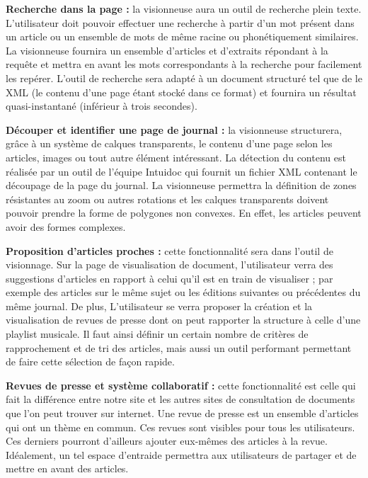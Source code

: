     \textbf{Recherche dans la page :} la visionneuse aura un outil de recherche plein texte. L'utilisateur doit pouvoir effectuer une recherche à partir d’un mot présent dans un article ou un ensemble de mots de même racine ou phonétiquement similaires.
    La visionneuse fournira un ensemble d’articles et d'extraits répondant à la requête et mettra en avant les mots correspondants à la recherche pour facilement les repérer.
    L’outil de recherche sera adapté à un document structuré tel que de le XML (le contenu d’une page étant stocké dans ce format) et fournira
    un résultat quasi-instantané (inférieur à trois secondes).


    \textbf{Découper et identifier une page de journal :} la visionneuse structurera, grâce à un système de calques transparents, le contenu d’une page selon
    les articles, images ou tout autre élément intéressant. La détection du contenu est réalisée par un outil de l’équipe Intuidoc qui fournit un
    fichier XML contenant le découpage de la page du journal. La visionneuse permettra la définition de zones résistantes au zoom ou autres
    rotations et les calques transparents doivent pouvoir prendre la forme de polygones non convexes. En effet, les articles peuvent avoir des formes complexes.


    \textbf{Proposition d’articles proches :} cette fonctionnalité sera dans l’outil de visionnage. Sur la page de visualisation de document, l'utilisateur verra des suggestions d'articles en rapport à celui qu'il est en train de visualiser ; par exemple des articles sur le même sujet ou les éditions suivantes ou précédentes
    du même journal. De plus, L'utilisateur se verra proposer la création et la visualisation de revues de presse dont on peut rapporter la structure
    à celle d’une playlist musicale. Il faut ainsi définir un certain nombre de critères de rapprochement et de tri des articles, mais aussi un outil performant permettant de faire cette sélection de façon rapide.

    \textbf{Revues de presse et système collaboratif :} cette fonctionnalité est celle qui fait la différence entre notre site et les autres sites de consultation de documents que l'on peut trouver sur internet. Une revue de presse est un ensemble d'articles qui ont un thème en commun. Ces revues sont visibles pour tous les utilisateurs. Ces derniers pourront d'ailleurs ajouter eux-mêmes des articles à la revue. Idéalement, un tel espace d’entraide permettra aux utilisateurs de partager et de mettre en avant des articles.
		
